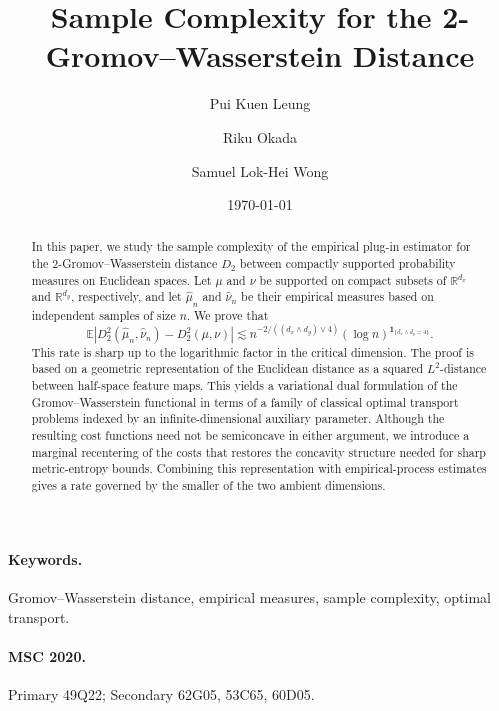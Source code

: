 \documentclass[11pt]{amsart}
\title{Sample Complexity for the 2-Gromov--Wasserstein Distance}
\author{Pui Kuen Leung}
\author{Riku Okada}
\author{Samuel Lok-Hei Wong}
\date{\today}
\theoremstyle{definition}
\theoremstyle{remark}
\newcommand{\1}{\mathbf{1}}
\numberwithin{equation}{section}
\begin{document}
\begin{abstract}
In this paper, we study the sample complexity of the empirical plug-in estimator for the
$2$-Gromov--Wasserstein distance $D_2$ between compactly supported probability measures on 
Euclidean spaces. Let $\mu$ and $\nu$ be supported on compact subsets of 
$\mathbb{R}^{d_x}$ and $\mathbb{R}^{d_y}$, respectively, and let $\widehat\mu_n$ and $\widehat\nu_n$ be their empirical measures based on independent samples of size $n$. We prove that
\[
\mathbb{E}\left|D_2^2(\widehat\mu_n,\widehat\nu_n)-D_2^2(\mu,\nu)\right|
\lesssim
n^{-2/((d_x\wedge d_y)\vee 4)}
(\log n)^{\mathbf 1_{\{d_x\wedge d_y=4\}}}.
\]
This rate is sharp up to the logarithmic factor in the critical dimension. The proof is based on a geometric representation of the Euclidean distance as a squared $L^2$-distance between half-space feature maps. This yields a variational dual formulation of the Gromov--Wasserstein functional in terms of a family of classical optimal transport problems indexed by an infinite-dimensional auxiliary parameter. Although the resulting cost functions need not be semiconcave in either argument, we introduce a marginal recentering of the costs that restores the concavity structure needed for sharp metric-entropy bounds. Combining this representation with empirical-process estimates gives a rate governed by the smaller of the two ambient dimensions.
\end{abstract}
\maketitle 

\paragraph{Keywords.}
Gromov--Wasserstein distance, empirical measures, sample complexity, optimal transport.

\paragraph{MSC 2020.}
Primary 49Q22; Secondary 62G05, 53C65, 60D05.
\end{document}
